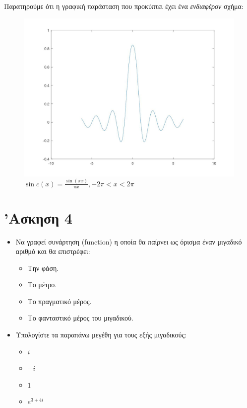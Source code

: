 \documentclass{article}
\begin{document}
Παρατηρούμε ότι η γραφική παράσταση που προκύπτει έχει ένα \textit{ενδιαφέρον}
σχήμα:

\begin{figure}[H]
        \centering
        \includegraphics[width=\linewidth]{res/fig1.jpg}
        \caption{$\sin c(x) = \frac{\sin(\pi x)}{\pi x}, -2\pi < x < 2\pi$}
\end{figure}

\section{'Ασκηση 4}

\begin{itemize}
        \item Να γραφεί συνάρτηση (function) η οποία θα παίρνει ως όρισμα
        έναν μιγαδικό αριθμό και θα επιστρέφει:
        \begin{itemize}
                \item Την φάση.
                \item Το μέτρο.
                \item Το πραγματικό μέρος.
                \item Το φανταστικό μέρος του μιγαδικού.
        \end{itemize}
        \item Υπολογίστε τα παραπάνω μεγέθη για τους εξής μιγαδικούς:
        \begin{itemize}
                \item $i$
                \item $-i$
                \item $1$
                \item $e^{3+4i}$
        \end{itemize}
\end{itemize}
\end{document}
